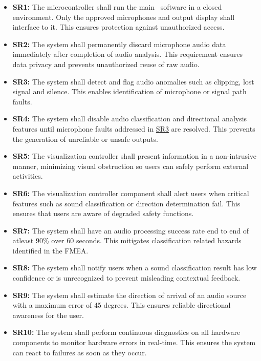 \documentclass{article}
\begin{document}
\begin{itemize}
    \item \label{SR1}\textbf{SR1:} The microcontroller shall run the main
    \progname ~software in a closed environment. Only the approved
    microphones and output display shall interface to it. This ensures
    protection against unauthorized access.

    \item \label{SR2}\textbf{SR2:} The system shall permanently discard
    microphone audio data immediately after completion of audio analysis.
    This requirement ensures data privacy and prevents unauthorized reuse of
    raw audio.

    \item \label{SR3}\textbf{SR3:} The system shall
    detect and flag audio anomalies such as clipping, lost signal and silence.
    This enables identification of microphone or signal path faults.

    \item \label{SR4}\textbf{SR4:} The system shall disable audio classification
    and directional analysis features until microphone faults addressed in
    \hyperref[SR3]{SR3} are resolved. This prevents the generation of
    unreliable or unsafe outputs.

    \item \label{SR5}\textbf{SR5:} The visualization controller 
    shall present information in a non-intrusive manner, minimizing visual
    obstruction so users can safely perform external activities.

    \item \label{SR6}\textbf{SR6:} The visualization controller component
    shall alert users when critical features such as sound classification or
    direction determination fail. This ensures that users are aware of degraded
    safety functions.

    \item \label{SR7}\textbf{SR7:} The system shall have
    an audio processing success rate end to end of atleast 90\% over 60 seconds.
    This mitigates classification related hazards identified in the FMEA.

    \item \label{SR8}\textbf{SR8:} The system shall notify users when a sound 
    classification result has low confidence or is unrecognized to prevent 
    misleading contextual feedback.

    \item \label{SR9}\textbf{SR9:} The system shall estimate the
    direction of arrival of an audio source with a maximum error of 45 degrees.
    This ensures reliable directional awareness for the user.

    \item \label{SR10}\textbf{SR10:} The system shall perform continuous
    diagnostics on all hardware components to monitor hardware errors in
    real-time. This ensures the system can react to failures as soon as they
    occur.
    
\end{itemize}
\end{document}
